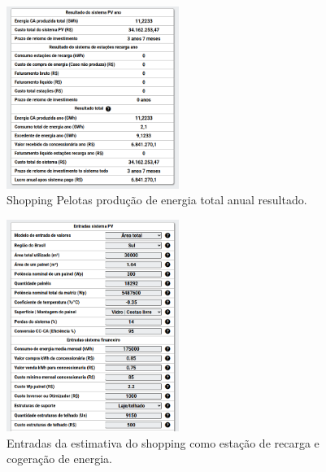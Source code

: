 \documentclass{beamer}
\begin{document}
\begin{frame}

\begin{figure}[H]
    \centering
    \includegraphics[width=0.5\textwidth]{./Figuras/shopping_4.png}
    \caption{Shopping Pelotas produção de energia total anual resultado.}
   \label{fig:shopping_4}
\end{figure}

\end{frame}

\begin{frame}

\begin{figure}[H]
    \centering
    \includegraphics[width=0.5\textwidth]{./Figuras/shopping_5_1.png}
    \caption{Entradas da estimativa do shopping como estação de recarga e cogeração de energia.}
   \label{fig:shopping_5_1}
\end{figure}


\end{frame}
\end{document}
